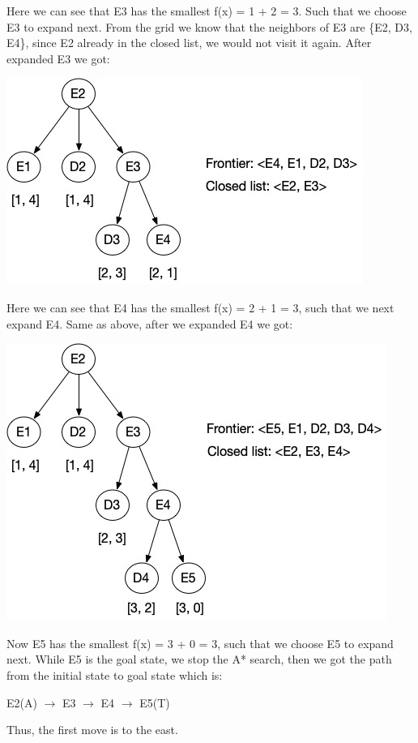 \documentclass[11pt]{report}
\begin{document}
Here we can see that E3 has the smallest f(x) = 1 + 2 = 3. Such that we choose E3 to expand next. From the grid we know that the neighbors of E3 are \{E2, D3, E4\}, since E2 already in the closed list, we would not visit it again. After expanded E3 we got:

\begin{center}
\includegraphics[scale=0.5]{Part1a_2}
\end{center}

Here we can see that E4 has the smallest f(x) = 2 + 1 = 3, such that we next expand E4. Same as above, after we expanded E4 we got:

\begin{center}
\includegraphics[scale=0.5]{Part1a_3}
\end{center}

Now E5 has the smallest f(x) = 3 + 0 = 3, such that we choose E5 to expand next. While E5 is the goal state, we stop the A* search, then we got the path from the initial state to goal state which is: 

\begin{center}
E2(A) $\rightarrow$ E3 $\rightarrow$ E4 $\rightarrow$ E5(T)
\end{center}
Thus, the first move is to the east. \\
\newpage
\end{document}
